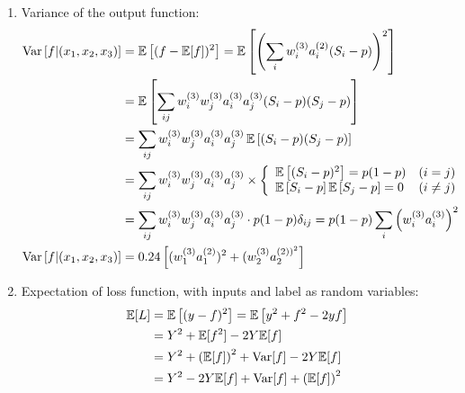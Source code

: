 \documentclass[a4paper, 10pt]{article}
\begin{document}
\begin{enumerate}[label=(\alph*)]
    \item Variance of the output function:
    \begin{equation}
        \begin{aligned}
            {\rm Var} \left[f | (x_1, x_2, x_3)\right] &= \mathbb{E} \left[(f - \mathbb{E}[f])^2\right] = \mathbb{E} \left[\left(\sum_i w_i^{(3)} a_i^{(2)} (S_i - p)\right)^2\right] \\
            &= \mathbb{E} \left[\sum_{ij} w_i^{(3)} w_j^{(3)} a_i^{(3)} a_j^{(3)} (S_i - p) (S_j - p) \right] \\
            &= \sum_{ij} w_i^{(3)} w_j^{(3)} a_i^{(3)} a_j^{(3)} \, \mathbb{E} \left[(S_i - p) (S_j - p)\right] \\ 
            &=\sum_{ij} w_i^{(3)} w_j^{(3)} a_i^{(3)} a_j^{(3)} \times 
            \left\{\begin{array}{ll}
                \mathbb{E} \left[(S_i - p)^2\right] = p(1-p) & (i=j) \\ 
                \mathbb{E}\left[S_i - p\right] \mathbb{E}\left[S_j - p\right] = 0 & (i\neq j)
            \end{array}\right. \\
            &= \sum_{ij} w_i^{(3)} w_j^{(3)} a_i^{(3)} a_j^{(3)} \cdot p(1-p) \delta_{ij} = p(1-p) \sum_{i} \left(w_i^{(3)} a_i^{(3)}\right)^2 \\ 
            {\rm Var} \left[f | (x_1, x_2, x_3)\right] &= 0.24 \left[(w_1^{(3)} a_1^{(2)})^2 + (w_2^{(3)} a_2^{(2))^2}\right]
        \end{aligned}
    \end{equation}
    
    \item Expectation of loss function, with inputs and label as random variables:
    \begin{equation}
        \begin{aligned}
            \mathbb{E}[L] &= \mathbb{E} \left[(y - f)^2\right] = \mathbb{E} \left[y^2 + f^2 - 2yf\right] \\ 
            &= Y^2 + \mathbb{E} [f^2] - 2Y \mathbb{E} [f] \\ 
            &= Y^2 + \left(\mathbb{E} [f]\right)^2 + {\rm Var} [f] - 2Y \mathbb{E} [f] \\ 
            &= Y^2 - 2Y \mathbb{E} [f] + {\rm Var} [f] + \left(\mathbb{E} [f]\right)^2
        \end{aligned}
    \end{equation}
    

\end{enumerate}
\end{document}
